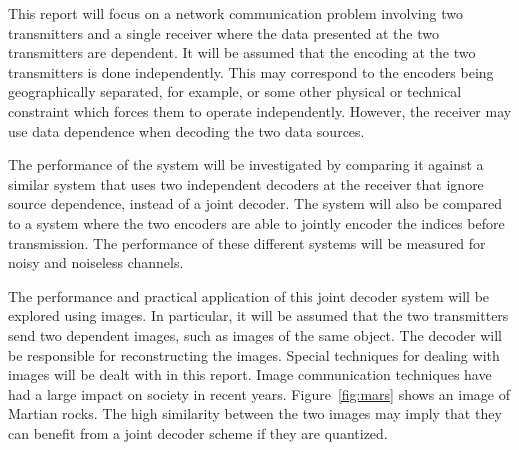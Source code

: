 \documentclass[10pt,twoside,titlepage]{article}
\begin{document}
This report will focus on a network communication problem involving two transmitters and a single receiver where the data presented at the two transmitters are dependent. It will be assumed that the encoding at the two transmitters is done independently. This may correspond to the encoders being geographically separated, for example, or some other physical or technical constraint which forces them to operate independently. However, the receiver may use data dependence when decoding the two data sources.

The performance of the system will be investigated by comparing it against a similar system that uses two independent decoders at the receiver that ignore source dependence, instead of a joint decoder. The system will also be compared to a system where the two encoders are able to jointly encoder the indices before transmission. The performance of these different systems will be measured for noisy and noiseless channels. 

The performance and practical application of this joint decoder system will be explored using images. In particular, it will be assumed that the two transmitters send two dependent images, such as images of the same object. The decoder will be responsible for reconstructing the images. Special techniques for dealing with images will be dealt with in this report. Image communication techniques have had a large impact on society in recent years. Figure~\ref{fig:mars} shows an image of Martian rocks. The high similarity between the two images may imply that they can benefit from a joint decoder scheme if they are quantized.
\end{document}
